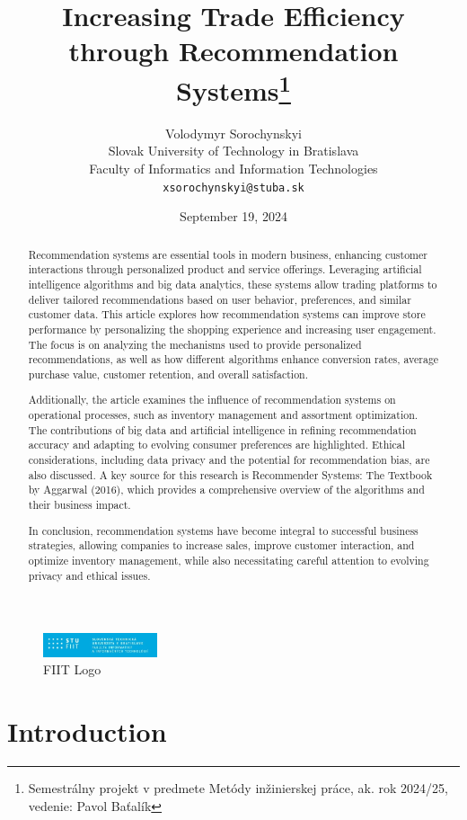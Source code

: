 \documentclass[10pt,twoside,slovak,a4paper]{article}
\title{Increasing Trade Efficiency through Recommendation Systems\thanks{Semestrálny projekt v predmete Metódy inžinierskej práce, ak. rok 2024/25, vedenie: Pavol Baťalík}} %
\author{Volodymyr Sorochynskyi\\[2pt]
	{\small Slovak University of Technology in Bratislava}\\
	{\small Faculty of Informatics and Information Technologies}\\
	{\small \texttt{xsorochynskyi@stuba.sk}}
	}
\date{\small September 19, 2024} %
\begin{document}
\maketitle

\begin{abstract}
Recommendation systems are essential tools in modern business, enhancing customer interactions through personalized product and service offerings. Leveraging artificial intelligence algorithms and big data analytics, these systems allow trading platforms to deliver tailored recommendations based on user behavior, preferences, and similar customer data. This article explores how recommendation systems can improve store performance by personalizing the shopping experience and increasing user engagement. The focus is on analyzing the mechanisms used to provide personalized recommendations, as well as how different algorithms enhance conversion rates, average purchase value, customer retention, and overall satisfaction.

Additionally, the article examines the influence of recommendation systems on operational processes, such as inventory management and assortment optimization. The contributions of big data and artificial intelligence in refining recommendation accuracy and adapting to evolving consumer preferences are highlighted. Ethical considerations, including data privacy and the potential for recommendation bias, are also discussed. A key source for this research is Recommender Systems: The Textbook by Aggarwal (2016), which provides a comprehensive overview of the algorithms and their business impact.

In conclusion, recommendation systems have become integral to successful business strategies, allowing companies to increase sales, improve customer interaction, and optimize inventory management, while also necessitating careful attention to evolving privacy and ethical issues.
\end{abstract}

\begin{figure}[htbp]
    \centering
    \includegraphics[width=0.3\textwidth]{logo.jpg}
    \caption{FIIT Logo}
    \label{fig:fiit_logo}
\end{figure}


\section{Introduction}
\end{document}
